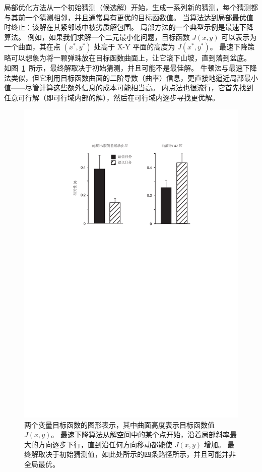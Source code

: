 局部优化方法从一个初始猜测（候选解）开始，生成一系列新的猜测，每个猜测都与其前一个猜测相邻，并且通常具有更优的目标函数值。
当算法达到局部最优值时终止：该解在其紧邻域中被劣质解包围。
局部方法的一个典型示例是最速下降算法。
例如，如果我们求解一个二元最小化问题，目标函数 $J(x,y)$ 可以表示为一个曲面，其在点 $(x^*,y^*)$ 处高于 X-Y 平面的高度为 $J(x^*,y^*)$。
最速下降策略可以想象为将一颗弹珠放在目标函数曲面上，让它滚下山坡，直到落到盆底。
如图~\ref{fig:9_4}~所示，最终解取决于初始猜测，并且可能不是最佳解。
牛顿法与最速下降法类似，但它利用目标函数曲面的二阶导数（曲率）信息，更直接地逼近局部最小值——尽管计算这些额外信息的成本可能相当高。
内点法也很流行，它首先找到任意可行解（即可行域内部的解），然后在可行域内逐步寻找更优解。


\begin{figure}[!htb]
	\centering
	\includegraphics[width=1.0\linewidth]{chap9/9_4}
	\caption{两个变量目标函数的图形表示，其中曲面高度表示目标函数值 $J(x,y)$。
		最速下降算法从解空间中的某个点开始，沿着局部斜率最大的方向逐步下行，直到沿任何方向移动都能使 $J(x,y)$ 增加。
		最终解取决于初始猜测值，如此处所示的四条路径所示，并且可能并非全局最优。 \label{fig:9_4}}
\end{figure}


